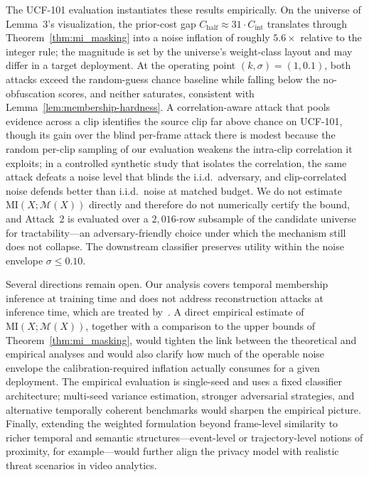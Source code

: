 \documentclass[sigconf,anonymous, review]{acmart}
\newcommand{\MI}{\mathrm{MI}}
\begin{document}
The UCF-101 evaluation instantiates these results empirically. On the universe of Lemma~3's visualization, the prior-cost gap $C_{\mathrm{half}} \approx 31 \cdot C_{\mathrm{int}}$ translates through Theorem~\ref{thm:mi_masking} into a noise inflation of roughly $5.6\times$ relative to the integer rule; the magnitude is set by the universe's weight-class layout and may differ in a target deployment. At the operating point $(k, \sigma) = (1, 0.1)$, both attacks exceed the random-guess chance baseline while falling below the no-obfuscation scores, and neither saturates, consistent with Lemma~\ref{lem:membership-hardness}. A correlation-aware attack that pools evidence across a clip identifies the source clip far above chance on UCF-101, though its gain over the blind per-frame attack there is modest because the random per-clip sampling of our evaluation weakens the intra-clip correlation it exploits; in a controlled synthetic study that isolates the correlation, the same attack defeats a noise level that blinds the i.i.d.\ adversary, and clip-correlated noise defends better than i.i.d.\ noise at matched budget. We do not estimate $\MI(X; \mathcal{M}(X))$ directly and therefore do not numerically certify the bound, and Attack~2 is evaluated over a $2{,}016$-row subsample of the candidate universe for tractability---an adversary-friendly choice under which the mechanism still does not collapse. The downstream classifier preserves utility within the noise envelope $\sigma \le 0.10$.

Several directions remain open. Our analysis covers temporal membership inference at training time and does not address reconstruction attacks at inference time, which are treated by~\cite{xiao2024formal}. A direct empirical estimate of $\MI(X; \mathcal{M}(X))$, together with a comparison to the upper bounds of Theorem~\ref{thm:mi_masking}, would tighten the link between the theoretical and empirical analyses and would also clarify how much of the operable noise envelope the calibration-required inflation actually consumes for a given deployment. The empirical evaluation is single-seed and uses a fixed classifier architecture; multi-seed variance estimation, stronger adversarial strategies, and alternative temporally coherent benchmarks would sharpen the empirical picture. Finally, extending the weighted formulation beyond frame-level similarity to richer temporal and semantic structures---event-level or trajectory-level notions of proximity, for example---would further align the privacy model with realistic threat scenarios in video analytics.
\end{document}
